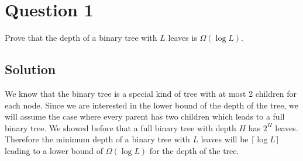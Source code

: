 
\section*{Question 1}
Prove that the depth of a binary tree with $L$ leaves is $\Omega(\log L)$.
\subsection*{Solution}
We know that the binary tree is a special kind of tree with at most 2 children for each node. Since we are interested in the lower bound of the depth of the tree, we will assume the case where every parent has two children which leads to a full binary tree. We showed before that a full binary tree with depth $H$ has $2^H$ leaves. Therefore the minimum depth of a binary tree with $L$ leaves will be $\lceil \log L \rceil$ leading to a lower bound of $\Omega (\log L)$ for the depth of the tree.
